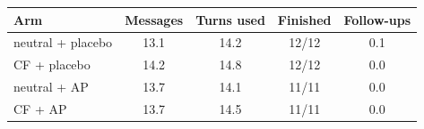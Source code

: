\begin{tabular}{lcccc}
\toprule
Arm & Messages & Turns used & Finished & Follow-ups \\
\midrule
neutral + placebo & 13.1 & 14.2 & 12/12 & 0.1 \\
CF + placebo & 14.2 & 14.8 & 12/12 & 0.0 \\
neutral + AP & 13.7 & 14.1 & 11/11 & 0.0 \\
CF + AP & 13.7 & 14.5 & 11/11 & 0.0 \\
\bottomrule
\end{tabular}
